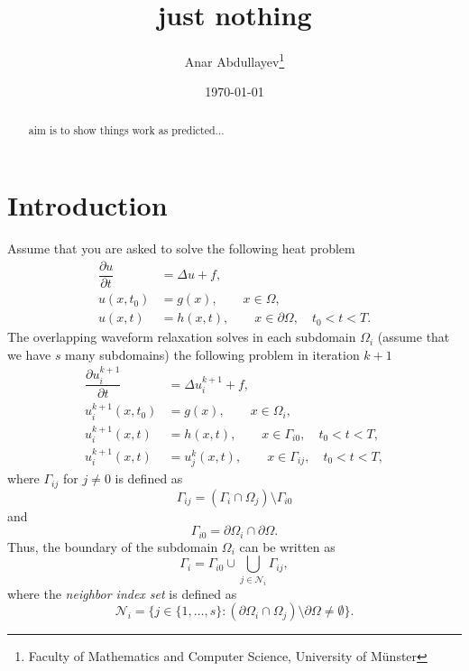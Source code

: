 \documentclass[a4paper, 11pt]{article}
\title{just nothing}
\author{Anar Abdullayev\thanks{Faculty of Mathematics and Computer Science, University of Münster}}
\date{\today}
\theoremstyle{plain}
\theoremstyle{definition}
\theoremstyle{remark}
\begin{document}
\maketitle

\begin{abstract}
    aim is to show things work as predicted...
\end{abstract}

\section{Introduction}
Assume that you are asked to solve the following heat problem
\begin{align*}
    \dfrac{\partial u}{\partial t} &= \Delta u + f,\\
    u(x, t_{0}) &= g(x), \qquad x\in \Omega,\\
    u(x, t) &= h(x, t), \qquad x\in \partial\Omega, \quad t_0<t<T.
\end{align*}
The overlapping waveform relaxation solves in each subdomain $\Omega_i$ (assume that we have $s$ many subdomains) the following problem in iteration $k+1$
\begin{align*}
    \dfrac{\partial u_{i}^{k+1}}{\partial t} &= \Delta u_{i}^{k+1} + f,\\
    u_{i}^{k+1}(x, t_{0}) &= g(x), \qquad x\in \Omega_{i},\\
    u_{i}^{k+1}(x, t) &= h(x, t), \qquad x\in \Gamma_{i0}, \quad t_0<t<T,\\
    u_{i}^{k+1}(x, t) &= u_{j}^{k}(x, t), \qquad x\in \Gamma_{ij}, \quad t_0<t<T,
\end{align*}
where $\Gamma_{ij}$ for $j\neq 0$ is defined as
\begin{equation*}
    \Gamma_{ij} = \left(\Gamma_{i}\cap\Omega_{j}\right)\setminus \Gamma_{i0}
\end{equation*}
and
\begin{equation*}
    \Gamma_{i0} = \partial \Omega_{i} \cap \partial\Omega.
\end{equation*}
Thus, the boundary of the subdomain $\Omega_{i}$ can be written as
\begin{equation*}
    \Gamma_{i} = \Gamma_{i0} \cup \bigcup_{j\in \mathcal{N}_{i}}\Gamma_{ij},
\end{equation*}
where the \textit{neighbor index set} is defined as
\begin{equation*}
    \mathcal{N}_{i} = \{j\in \{1, \ldots, s\}: \left(\partial\Omega_{i}\cap\Omega_{j}\right)\setminus \partial\Omega \neq \emptyset\}.
\end{equation*}
\end{document}
